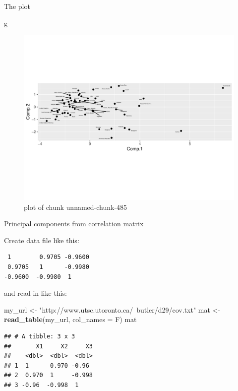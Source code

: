\documentclass[ignorenonframetext,]{beamer}
\newenvironment{Shaded}{\begin{snugshade}}{\end{snugshade}}
\newcommand{\DataTypeTok}[1]{\textcolor[rgb]{0.13,0.29,0.53}{#1}}
\newcommand{\KeywordTok}[1]{\textcolor[rgb]{0.13,0.29,0.53}{\textbf{#1}}}
\newcommand{\NormalTok}[1]{#1}
\newcommand{\StringTok}[1]{\textcolor[rgb]{0.31,0.60,0.02}{#1}}
\begin{document}
\begin{frame}[fragile]{The plot}
\protect\hypertarget{the-plot-9}{}

\begin{Shaded}
\begin{Highlighting}[]
\NormalTok{g}
\end{Highlighting}
\end{Shaded}

\begin{figure}
\centering
\includegraphics{figure/unnamed-chunk-485-1.pdf}
\caption{plot of chunk unnamed-chunk-485}
\end{figure}

\end{frame}

\begin{frame}[fragile]{Principal components from correlation matrix}
\protect\hypertarget{principal-components-from-correlation-matrix}{}

Create data file like this:

\begin{verbatim}
 1        0.9705 -0.9600
 0.9705   1      -0.9980
-0.9600  -0.9980  1
\end{verbatim}

and read in like this:

\begin{Shaded}
\begin{Highlighting}[]
\NormalTok{my_url <-}\StringTok{ "http://www.utsc.utoronto.ca/~butler/d29/cov.txt"}
\NormalTok{mat <-}\StringTok{ }\KeywordTok{read_table}\NormalTok{(my_url, }\DataTypeTok{col_names =}\NormalTok{ F)}
\NormalTok{mat}
\end{Highlighting}
\end{Shaded}

\begin{verbatim}
## # A tibble: 3 x 3
##       X1     X2     X3
##    <dbl>  <dbl>  <dbl>
## 1  1      0.970 -0.96 
## 2  0.970  1     -0.998
## 3 -0.96  -0.998  1
\end{verbatim}

\end{frame}
\end{document}
